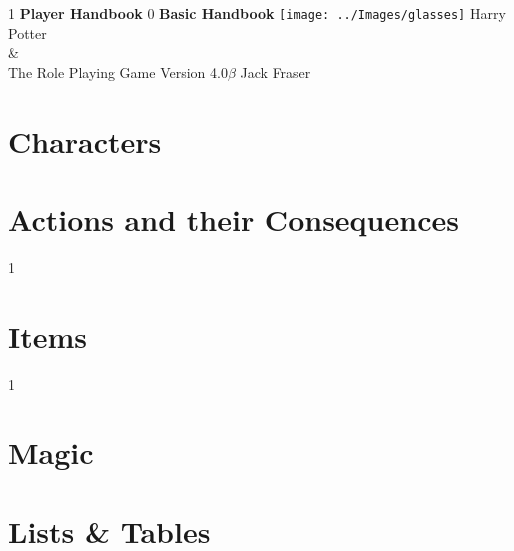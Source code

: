 \documentclass[oneside, twocolumn,9pt,english]{extbook}
\def\coreMode{1}
\begin{document}
\begin{titlepage}
    \centering
    \vfill
    \if\coreMode1
    {\bfseries
        {\HP \fontsize{40}{35}\selectfont Player Handbook}
    }    
    \fi
    \if\coreMode0
    {\bfseries
        {\HP \fontsize{40}{35}\selectfont Basic Handbook}
    } 
    \fi
    \vfill
    \texttt{[image: ../Images/glasses]} %
    \vfill
    {\HP \fontsize{30}{24} \selectfont  Harry Potter \\\&\\ The Role Playing Game}
    \normalsize
    \vfill
    {\HP \fontsize{22}{0} \selectfont Version 4.0$\beta$ \hfill Jack Fraser}
\end{titlepage}

\setcounter{tocdepth}{1}  
\begin{spacing}{0.8}
\footnotesize
\tableofcontents
\normalsize
\end{spacing}


\cleartoleftpage
\part{Characters} \label{C:CharacterCreation}






\cleartoleftpage
\part{Actions and their Consequences}





\if\coreMode1	
	
\fi
\part{Items}


\if \coreMode1
	
\fi

\cleartoleftpage
\part{Magic}



\part{Lists \& Tables}
\end{document}
